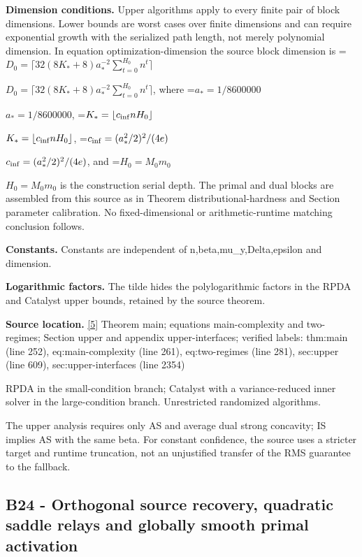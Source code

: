 \documentclass[10pt,a4paper]{article}
\newcommand{\AtlasMath}[1]{\par\begingroup\centering\setbox0=\hbox{$\displaystyle #1$}\ifdim\wd0>1.4\linewidth\typeout{ATLAS WIDE FORMULA: \the\wd0}\fi\ifdim\wd0>\linewidth\resizebox{\linewidth}{!}{\box0}\else\box0\fi\par\endgroup}
\newcommand{\AtlasInlineMath}[1]{\begingroup\setbox0=\hbox{$#1$}\ifdim\wd0>.4\linewidth\endgroup\AtlasMath{#1}\else\endgroup$#1$\fi}
\begin{document}
\textbf{Dimension conditions.} Upper algorithms apply to every finite pair of block dimensions. Lower bounds are worst cases over finite dimensions and can require exponential growth with the serialized path length, not merely polynomial dimension. In equation optimization-dimension the source block dimension is \AtlasInlineMath{D_0=\lceil32(8K_*+8)a_*^{-2}\sum_{t=0}^{H_0}n^t\rceil}, where \AtlasInlineMath{a_*=1/8600000}, \AtlasInlineMath{K_*=\lfloor c_{\rm inf}nH_0\rfloor}, \AtlasInlineMath{c_{\rm inf}=(a_*^2/2)^2/(4e)}, and \AtlasInlineMath{H_0=M_0m_0} is the construction serial depth. The primal and dual blocks are assembled from this source as in Theorem distributional-hardness and Section parameter calibration. No fixed-dimensional or arithmetic-runtime matching conclusion follows.



\textbf{Constants.} Constants are independent of n,beta,mu\_y,Delta,epsilon and dimension.



\textbf{Logarithmic factors.} The tilde hides the polylogarithmic factors in the RPDA and Catalyst upper bounds, retained by the source theorem.



\textbf{Source location.} \href{https://github.com/WU-Wendao/Colombo/blob/main/colombo_sensorium/Complexity_altas/data/sources/colombo/U06/manuscript.pdf}{[5]} Theorem main; equations main-complexity and two-regimes; Section upper and appendix upper-interfaces; verified labels: thm:main (line 252), eq:main-complexity (line 261), eq:two-regimes (line 281), sec:upper (line 609), sec:upper-interfaces (line 2354)



RPDA in the small-condition branch; Catalyst with a variance-reduced inner solver in the large-condition branch. Unrestricted randomized algorithms.



The upper analysis requires only AS and average dual strong concavity; IS implies AS with the same beta. For constant confidence, the source uses a stricter target and runtime truncation, not an unjustified transfer of the RMS guarantee to the fallback.



\subsection{B24 - Orthogonal source recovery, quadratic saddle relays and globally smooth primal activation}
\end{document}
